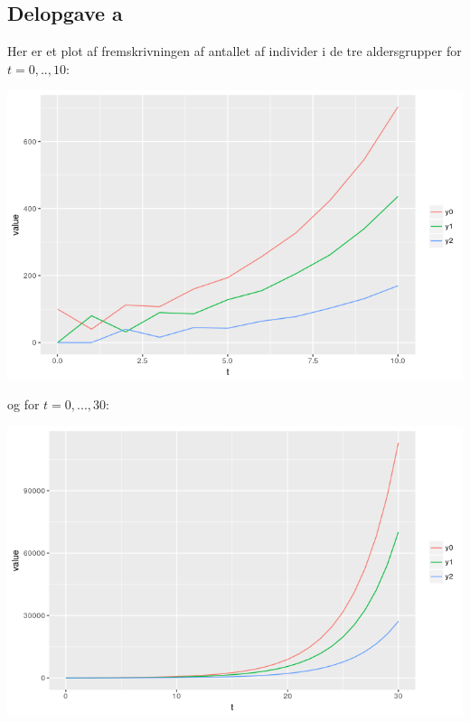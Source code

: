 \documentclass[12pt]{article}
\begin{document}
\subsection{Delopgave a}

Her er et plot af fremskrivningen af antallet af individer i de tre aldersgrupper for $t=0,..,10$:
\begin{center}
\includegraphics[scale=0.5]{q3p1.png}
\end{center}
og for $t=0,...,30$:
\begin{center}
\includegraphics[scale=0.5]{q3p2.png}
\end{center}
\end{document}
